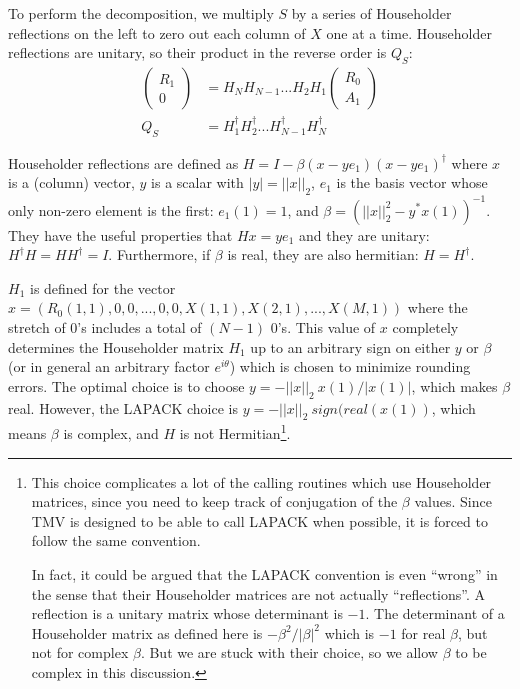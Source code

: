 \documentclass[twoside,letterpaper,11pt]{article}
\begin{document}
To perform the decomposition, we multiply $S$ by a series of Householder reflections
on the left to zero out each column of $X$ one at a time.  Householder reflections 
are unitary, so their product in the reverse order is $Q_S$:
\begin{align*}
\left(\begin{array}{c}R_1 \\ 0 \end{array}\right) &=
  H_N H_{N-1} ... H_2 H_1 
  \left(\begin{array}{c}R_0 \\ A_1 \end{array}\right)  \\
Q_S &= H_1^\dagger H_2^\dagger ... H_{N-1}^\dagger H_N^\dagger 
\end{align*}

Householder reflections are defined as $H = I - \beta (x - y e_1)  (x - y e_1)^\dagger$
where $x$ is a (column) vector, $y$ is a scalar with $|y| = ||x||_2$, $e_1$ is the
basis vector whose only non-zero element is the first: $e_1(1) = 1$, and
$\beta = (||x||_2^2 - y^* x(1))^{-1}$.
They have the useful properties that $H x = y e_1$ and they are unitary:
$H^\dagger H = H H^\dagger = I$.
Furthermore, if $\beta$ is real, they are also hermitian: $H = H^\dagger$.

$H_1$ is defined for the vector 
$x = (R_0(1,1), 0, 0, ... , 0, 0, X(1,1), X(2,1), ... , X(M,1) )$ 
where the stretch of $0$'s includes a total of $(N-1)$ $0$'s. This value of 
$x$ completely determines the Householder matrix $H_1$ up to an arbitrary sign
on either $y$ or $\beta$ (or in general an arbitrary factor $e^{i \theta}$) which is 
chosen to minimize rounding errors.  The optimal choice is to choose
$y = -||x||_2\:x(1)/|x(1)|$, which makes $\beta$ real.  
However, the LAPACK choice is $y = -||x||_2 \:sign(real(x(1))$, which means
$\beta$ is complex, and $H$ is not Hermitian\footnote{
This choice complicates a lot of the calling routines which use
Householder matrices, since you need to keep track of conjugation of the 
$\beta$ values.  Since TMV is designed to be able to call LAPACK
when possible, it is forced to follow the same convention.

In fact, it could be argued that the LAPACK convention is even ``wrong'' in the sense that
their Householder matrices are not actually ``reflections''.  A reflection is a 
unitary matrix whose determinant is $-1$.  The determinant of a Householder 
matrix as defined here is $-\beta^2/|\beta|^2$ which is $-1$ for real $\beta$, 
but not for complex $\beta$.  But we are stuck with their choice, so we allow $\beta$
to be complex in this discussion.
}.
\end{document}
